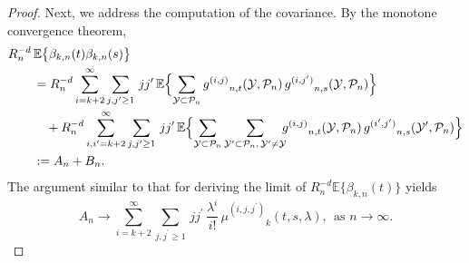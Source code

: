 \documentclass[11pt]{amsart}
\numberwithin{equation}{section}
\theoremstyle{plain}
\theoremstyle{definition}
\begin{document}
\begin{proof}
Next, we address the computation of the covariance. By the monotone convergence theorem,
\begin{align*}
R_n^{-d}\, &{\mathbb{E}} \bigl\{ \beta_{k,n}(t) \beta_{k,n}(s)\bigr\} \\
&= R_n^{-d} \sum_{i=k+2}^\infty \sum_{j, {j^{\prime}} \geq1} \, j {j^{\prime}}\, {\mathbb{E}} \Bigl\{ \sum_{{{\mathcal{Y}}} \subset {\mathcal P_n}} {g^{(i,j)}}_{n,t} ({{\mathcal{Y}}}, {\mathcal P_n})\, {g^{(i,j^{\prime})}}_{n,s} ({{\mathcal{Y}}}, {\mathcal P_n}) \Bigr\}  \\
&\quad +R_n^{-d} \sum_{i, {i^{\prime}}=k+2}^\infty \sum_{j, {j^{\prime}} \geq1}\, j {j^{\prime}}\, {\mathbb{E}} \Bigl\{ \sum_{{{\mathcal{Y}}} \subset {\mathcal P_n}} \sum_{{{\mathcal{Y}^{\prime}}} \subset {\mathcal P_n}, \, {{\mathcal{Y}^{\prime}}} \neq {{\mathcal{Y}}}} \hspace{-5pt}{g^{(i,j)}}_{n,t} ({{\mathcal{Y}}}, {\mathcal P_n})\, {g^{(i^{\prime},j^{\prime})}}_{n,s} ({{\mathcal{Y}^{\prime}}}, {\mathcal P_n}) \Bigr\} \\
&:= A_n + B_n.
\end{align*}
The argument similar to that for deriving the limit of $R_n^{-d} {\mathbb{E}} \bigl\{ \beta_{k,n}(t) \bigr\}$ yields
$$
A_n \to \sum_{i=k+2}^\infty \sum_{j, {j^{\prime}} \geq1}\, j {j^{\prime}}\, \frac{\lambda^i}{i!}\, {\mu^{(i,j,{j^{\prime}})}}_k (t,s,\lambda), \ \ \text{as } n \to \infty.
$$


\end{proof}
\end{document}
